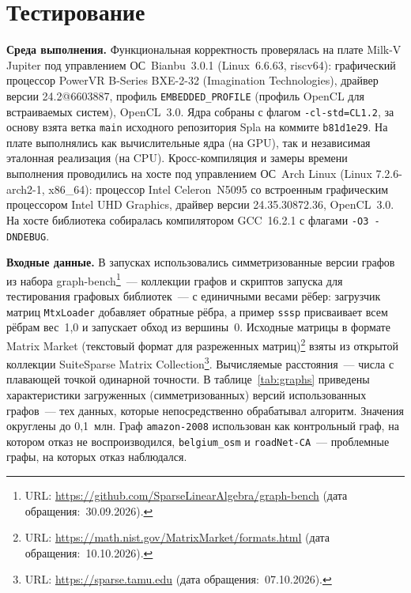 \documentclass[a4paper]{article}
\begin{document}
\section{Тестирование}

\textbf{Среда выполнения.} Функциональная корректность проверялась на плате Milk-V Jupiter под управлением ОС~Bianbu~3.0.1 (Linux~6.6.63, riscv64): графический процессор PowerVR B-Series BXE-2-32 (Imagination Technologies), драйвер версии 24.2@6603887, профиль \texttt{EMBEDDED\_PROFILE} (профиль OpenCL для встраиваемых систем), OpenCL~3.0. Ядра собраны с флагом \texttt{-cl-std=CL1.2}, за основу взята ветка \texttt{main} исходного репозитория Spla на коммите \texttt{b81d1e29}. На плате выполнялись как вычислительные ядра (на GPU), так и независимая эталонная реализация (на CPU). Кросс-компиляция и замеры времени выполнения проводились на хосте под управлением ОС~Arch Linux (Linux 7.2.6-arch2-1, x86\_64): процессор Intel Celeron~N5095 со встроенным графическим процессором Intel UHD Graphics, драйвер версии 24.35.30872.36, OpenCL~3.0. На хосте библиотека собиралась компилятором GCC~16.2.1 с флагами \texttt{-O3 -DNDEBUG}.

\textbf{Входные данные.} В запусках использовались симметризованные версии графов из набора graph-bench\footnote{URL: \url{https://github.com/SparseLinearAlgebra/graph-bench} (дата обращения:~30.09.2026).}~--- коллекции графов и скриптов запуска для тестирования графовых библиотек~--- с единичными весами рёбер: загрузчик матриц \texttt{MtxLoader} добавляет обратные рёбра, а пример \texttt{sssp} присваивает всем рёбрам вес~1,0 и запускает обход из вершины~0. Исходные матрицы в формате Matrix Market (текстовый формат для разреженных матриц)\footnote{URL: \url{https://math.nist.gov/MatrixMarket/formats.html} (дата обращения:~10.10.2026).} взяты из открытой коллекции SuiteSparse Matrix Collection\footnote{URL: \url{https://sparse.tamu.edu} (дата обращения:~07.10.2026).}. Вычисляемые расстояния~--- числа с плавающей точкой одинарной точности. В таблице~\ref{tab:graphs} приведены характеристики загруженных (симметризованных) версий использованных графов~--- тех данных, которые непосредственно обрабатывал алгоритм. Значения округлены до 0,1~млн. Граф \texttt{amazon-2008} использован как контрольный граф, на котором отказ не воспроизводился, \texttt{belgium\_osm} и \texttt{roadNet-CA}~--- проблемные графы, на которых отказ наблюдался.
\end{document}
